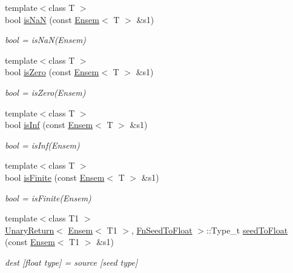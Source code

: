 \begin{DoxyCompactItemize}
{\footnotesize template$<$class T $>$ }\\bool \mbox{\hyperlink{group__eensem_ga2567a8b58f681cf59bfe43ccf72d2d54}{is\+NaN}} (const \mbox{\hyperlink{classENSEM_1_1Ensem}{Ensem}}$<$ T $>$ \&s1)
\begin{DoxyCompactList}\small\item\em bool = is\+Na\+N(\+Ensem) \end{DoxyCompactList}\item 
{\footnotesize template$<$class T $>$ }\\bool \mbox{\hyperlink{group__eensem_gaa66b7f8af2e0f2f38b3a8387b5848c5b}{is\+Zero}} (const \mbox{\hyperlink{classENSEM_1_1Ensem}{Ensem}}$<$ T $>$ \&s1)
\begin{DoxyCompactList}\small\item\em bool = is\+Zero(\+Ensem) \end{DoxyCompactList}\item 
{\footnotesize template$<$class T $>$ }\\bool \mbox{\hyperlink{group__eensem_gadb04ba05461a486afdf403c61b5bff34}{is\+Inf}} (const \mbox{\hyperlink{classENSEM_1_1Ensem}{Ensem}}$<$ T $>$ \&s1)
\begin{DoxyCompactList}\small\item\em bool = is\+Inf(\+Ensem) \end{DoxyCompactList}\item 
{\footnotesize template$<$class T $>$ }\\bool \mbox{\hyperlink{group__eensem_ga13016a14218fbe75f26f9acd37e1efe5}{is\+Finite}} (const \mbox{\hyperlink{classENSEM_1_1Ensem}{Ensem}}$<$ T $>$ \&s1)
\begin{DoxyCompactList}\small\item\em bool = is\+Finite(\+Ensem) \end{DoxyCompactList}\item 
{\footnotesize template$<$class T1 $>$ }\\\mbox{\hyperlink{structENSEM_1_1UnaryReturn}{Unary\+Return}}$<$ \mbox{\hyperlink{classENSEM_1_1Ensem}{Ensem}}$<$ T1 $>$, \mbox{\hyperlink{structENSEM_1_1FnSeedToFloat}{Fn\+Seed\+To\+Float}} $>$\+::Type\+\_\+t \mbox{\hyperlink{group__eensem_ga92fac3bc9ad6164daf90b83052f0d48e}{seed\+To\+Float}} (const \mbox{\hyperlink{classENSEM_1_1Ensem}{Ensem}}$<$ T1 $>$ \&s1)
\begin{DoxyCompactList}\small\item\em dest \mbox{[}float type\mbox{]} = source \mbox{[}seed type\mbox{]} \end{DoxyCompactList}\item 

\end{DoxyCompactItemize}
